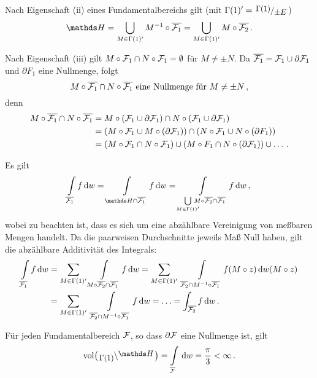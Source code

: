 \begin{bewe}
	Nach Eigenschaft (ii) eines Fundamentalbereichs gilt (mit $\Gamma(1)' = \modulo{\Gamma(1)}{\pm E}$)
	\[
	\HH = \bigcup_{M \in \Gamma(1)'} M^{-1} \circ \closure{\F_1} = \bigcup_{M \in \Gamma(1)'} M \circ \closure{\F_2}
	\,.
	\]
	
	Nach Eigenschaft (iii) gilt $M \circ \mathcal{F}_1 \cap N \circ \mathcal{F}_1 = \emptyset$ für $M \not= \pm N$.
	Da $\overline{\mathcal{F}_1} = \mathcal{F}_1 \cup \partial\mathcal{F}_1$ und $\partial F_1$ eine Nullmenge, folgt
	\[
	M \circ \overline{\mathcal{F}_1} \cap N\circ\overline{\mathcal{F}_1} \text{ eine Nullmenge für } M\not=\pm N
	\,,
	\]
	denn
	\begin{align*}
	M \circ \overline{\mathcal{F}_1} \cap N \circ \overline{\mathcal{F}_1}
	&= M \circ (\mathcal{F}_1 \cup \partial \mathcal{F}_1) \cap N \circ (\mathcal{F}_1 \cup \partial \mathcal{F}_1) \\
	&= (M \circ \mathcal{F}_1 \cup M \circ (\partial \mathcal{F}_1)) \cap (N \circ \mathcal{F}_1 \cup N \circ (\partial F_1)) \\
	&= (M \circ \mathcal{F}_1 \cap N \circ \mathcal{F}_1) \cup (M \circ F_1 \cap N \circ (\partial \mathcal{F}_1)) \cup \ldots
	\,.
	\end{align*}
	
	Es gilt
	\[
	\int\limits_{\closure{\F_1}} f \opd w
	= \int\limits_{\HH \cap \closure{\F_1}} f \opd w
	= \int\limits_{\bigcup\limits_{M \in \Gamma(1)'} \!\!\!\!\!\! M \circ \closure{\F_2} \cap \closure{\F_1}} f \opd w
	\,,
	\]
	wobei zu beachten ist, dass es sich um eine abzählbare Vereinigung von meßbaren Mengen handelt. Da die paarweisen Durchschnitte jeweils Maß Null haben, gilt die abzählbare Additivität des Integrals:
	\begin{align*}
	\int\limits_{\overline{\mathcal{F}_1}} f \,\mathrm{d} w
	&= \sum_{M \in \Gamma(1)'} \int\limits_{M\circ \overline{\mathcal{F}_2} \cap \overline{\mathcal{F}_1}} f \,\mathrm{d} w
	= \sum_{M \in \Gamma(1)'} \ \int\limits_{\overline{\mathcal{F}_2} \cap M^{-1} \circ \overline{\mathcal{F}_1}} f(M \circ z) \,\mathrm{d} w(M \circ z) \\
	&= \sum_{M \in \Gamma(1)'}\ \int\limits_{\overline{\mathcal{F}_2} \cap M^{-1} \circ \overline{\mathcal{F}_1}} f \,\mathrm{d} w
	= \ldots = \int_{\overline{\mathcal{F}_2}} f\,\mathrm{d} w
	\,.
	\end{align*}
\end{bewe}

\begin{bsp}
	Für jeden Fundamentalbereich $\mathcal{F}$, so dass $\partial \mathcal{F}$ eine Nullmenge ist, gilt
	\[
	\vol\bigl(\linksmodulo{\Gamma(1)}\HH\bigr) = \int\limits_{\closure \F} \opd w = \frac{\pi}{3} < \infty
	\,.
	\]
\end{bsp}


